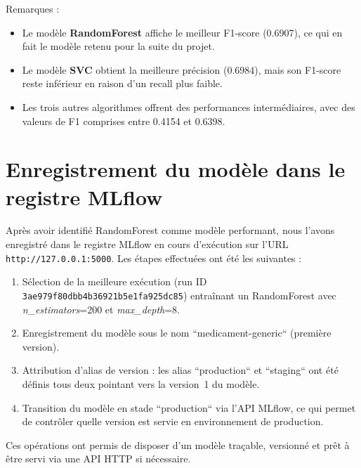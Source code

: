 \documentclass[12pt,a4paper]{report}
\begin{document}
\noindent Remarques :
\begin{itemize}
    \item Le modèle \textbf{RandomForest} affiche le meilleur F1-score (0.6907), ce qui en fait le modèle retenu pour la suite du projet.
    \item Le modèle \textbf{SVC} obtient la meilleure précision (0.6984), mais son F1-score reste inférieur en raison d'un recall plus faible.
    \item Les trois autres algorithmes offrent des performances intermédiaires, avec des valeurs de F1 comprises entre 0.4154 et 0.6398.
\end{itemize}

\section{Enregistrement du modèle dans le registre MLflow}
Après avoir identifié RandomForest comme modèle performant, nous l'avons enregistré dans le registre MLflow en cours d'exécution sur l'URL \texttt{http://127.0.0.1:5000}. Les étapes effectuées ont été les suivantes :
\begin{enumerate}
    \item Sélection de la meilleure exécution (run ID \texttt{3ae979f80dbb4b36921b5e1fa925dc85}) entraînant un RandomForest avec \textit{n\_estimators}=200 et \textit{max\_depth}=8.
    \item Enregistrement du modèle sous le nom ``medicament-generic`` (première version).
    \item Attribution d'alias de version : les alias ``production`` et ``staging`` ont été définis tous deux pointant vers la version~1 du modèle.
    \item Transition du modèle en stade ``production`` via l'API MLflow, ce qui permet de contrôler quelle version est servie en environnement de production.
\end{enumerate}
Ces opérations ont permis de disposer d'un modèle traçable, versionné et prêt à être servi via une API HTTP si nécessaire.
\end{document}
